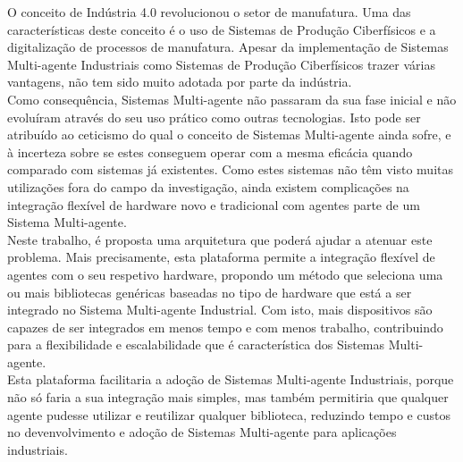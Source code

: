 
%

O conceito de Indústria 4.0 revolucionou o setor de manufatura. Uma das características deste conceito é o uso de Sistemas de Produção Ciberfísicos e a digitalização de processos de manufatura. Apesar da implementação de Sistemas Multi-agente Industriais como Sistemas de Produção Ciberfísicos trazer várias vantagens, não tem sido muito adotada por parte da indústria.\\

Como consequência, Sistemas Multi-agente não passaram da sua fase inicial e não evoluíram através do seu uso prático como outras tecnologias. Isto pode ser atribuído ao ceticismo do qual o conceito de Sistemas Multi-agente ainda sofre, e à incerteza sobre se estes conseguem operar com a mesma eficácia quando comparado com sistemas já existentes. Como estes sistemas não têm visto muitas utilizações fora do campo da investigação, ainda existem complicações na integração flexível de hardware novo e tradicional com agentes parte de um Sistema Multi-agente.\\

Neste trabalho, é proposta uma arquitetura que poderá ajudar a atenuar este problema. Mais precisamente, esta plataforma permite a integração flexível de agentes com o seu respetivo hardware, propondo um método que seleciona uma ou mais bibliotecas genéricas baseadas no tipo de hardware que está a ser integrado no Sistema Multi-agente Industrial. Com isto, mais dispositivos são capazes de ser integrados em menos tempo e com menos trabalho, contribuindo para a flexibilidade e escalabilidade que é característica dos Sistemas Multi-agente.\\

Esta plataforma facilitaria a adoção de Sistemas Multi-agente Industriais, porque não só faria a sua integração mais simples, mas também permitiria que qualquer agente pudesse utilizar e reutilizar qualquer biblioteca, reduzindo tempo e custos no devenvolvimento e adoção de Sistemas Multi-agente para aplicações industriais.

%
%


